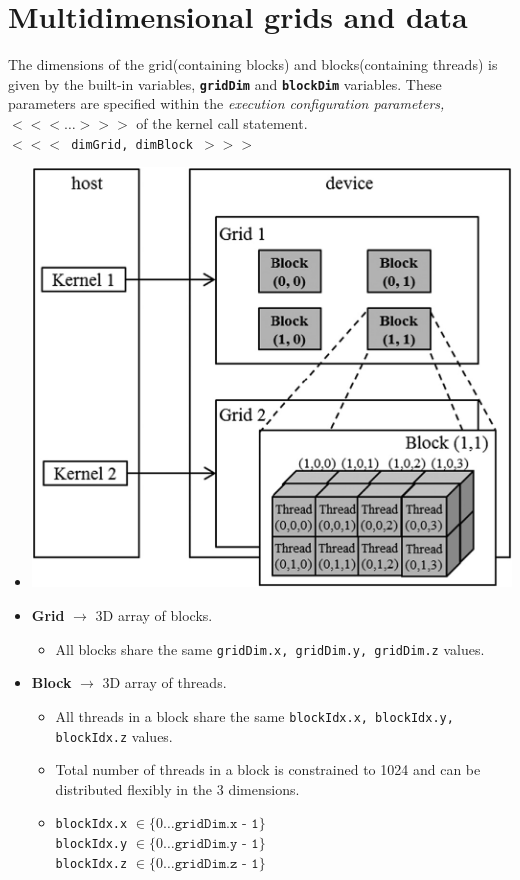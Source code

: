 \chapter{Multidimensional grids and data}
The dimensions of the grid(containing blocks) and blocks(containing threads) is given by the built-in variables, \textbf{\texttt{gridDim}} and \textbf{\texttt{blockDim}} variables. These parameters are specified within the \textit{execution configuration parameters, $<<<\dots>>>$} of the kernel call statement.\\\texttt{$<<<$ dimGrid, dimBlock $>>>$}
\begin{itemize}
    \item
          \begin{center}
              \includegraphics[width=0.6\linewidth]{Images/MultiDim_Grid/grid_structure.png}
          \end{center}
    \item \textbf{Grid }$\rightarrow$ 3D array of blocks.
          \begin{itemize}
              \item All blocks share the same \texttt{gridDim.x, gridDim.y, gridDim.z} values.
          \end{itemize}
    \item \textbf{Block} $\rightarrow$ 3D array of threads.
          \begin{itemize}
              \item All threads in a block share the same \texttt{blockIdx.x, blockIdx.y, blockIdx.z} values.
              \item Total number of threads in a block is constrained to 1024 and can be distributed flexibly in the 3 dimensions.
              \item \texttt{blockIdx.x} $\in \{0 \dots \texttt{gridDim.x - 1} \}$\\\texttt{blockIdx.y} $\in \{0 \dots \texttt{gridDim.y - 1} \}$\\\texttt{blockIdx.z} $\in \{0 \dots \texttt{gridDim.z - 1} \}$

\end{itemize}
\end{itemize}

